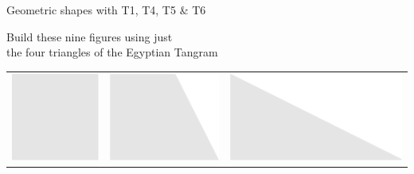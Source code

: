 \documentclass[14pt]{beamer}
\begin{document}
    
    \begin{frame}{Geometric shapes with T1, T4, T5 \& T6}
        \begin{center}
            Build these nine figures using just\\the four triangles of the Egyptian Tangram
            
            \bigskip\bigskip
        
            \begin{tabular}{ccc}
                    \includegraphics[scale=0.3]{figures/figure023a.pdf} \;\;&
                \;\;\includegraphics[scale=0.3]{figures/figure023b.pdf} \;\;&
                \;\;\includegraphics[scale=0.3]{figures/figure023c.pdf} \\[2ex]

\end{tabular}
\end{center}
\end{frame}
\end{document}
